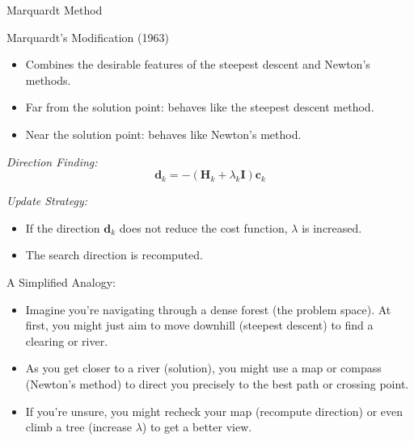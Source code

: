 \documentclass[
    NAME={Dr. Helga Ingimundardóttir},
    EMAIL={helgaingim@hi.is},
    FACULTY={Industrial Engineering},
    TITLE={Nonlinear Optimization},
    SUBTITLE={Approaches and Challenges},
    SEMINAR={VÉL113F},
    DATE={Design and Optimization}
]{../HI-latex/hi-beamer}
\begin{document}
    \begin{frame}{Marquardt Method}
        \begin{block}{Marquardt's Modification (1963)}
            \begin{itemize}
                \item Combines the desirable features of the steepest descent and Newton’s methods.
                \item Far from the solution point: behaves like the steepest descent method.
                \item Near the solution point: behaves like Newton’s method.
            \end{itemize}
        \end{block}

        \emph{Direction Finding:}
        \[ \mathbf{d}_k = -( \mathbf{H}_k + \lambda_k \mathbf{I} ) \mathbf{c}_k \]

        \emph{Update Strategy:}
        \begin{itemize}
            \item If the direction \( \mathbf{d}_k \) does not reduce the cost function, \( \lambda \) is increased.
            \item The search direction is recomputed.
        \end{itemize}

        \alert{A Simplified Analogy:}
        \begin{itemize}
            \item Imagine you're navigating through a dense forest (the problem space). At first, you might just aim
            to move downhill (steepest descent) to find a clearing or river.
            \item As you get closer to a river (solution), you might use a map or compass (Newton's method) to direct
            you precisely to the best path or crossing point.
            \item If you're unsure, you might recheck your map (recompute direction) or even climb a tree
            (increase \( \lambda \)) to get a better view.
        \end{itemize}

    \end{frame}
\end{document}
